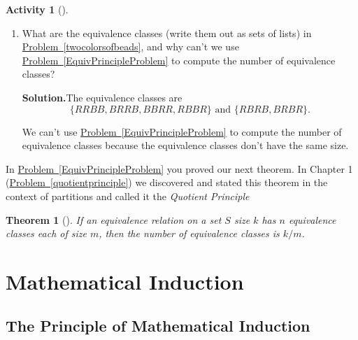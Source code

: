 \documentclass[10pt,]{book}
\theoremstyle{plain}
\newtheorem{theorem}{Theorem}[section]
\theoremstyle{definition}
\newtheorem{activity}[project]{Activity}
\numberwithin{equation}{chapter}
\begin{document}
\begin{activity}[]
\begin{enumerate}[label=(\alph*)]
~\par
\item What are the equivalence classes (write them out as sets of lists) in \hyperref[twocolorsofbeads]{Problem~\ref{twocolorsofbeads}}, and why can't we use \hyperref[EquivPrincipleProblem]{Problem~\ref{EquivPrincipleProblem}} to compute the number of equivalence classes?%
\par\medskip\noindent%
\textbf{Solution.}\quad The equivalence classes are%
\begin{equation*}
\{RRBB, BRRB, BBRR, RBBR\}
\mbox{~and~} 
\{RBRB, BRBR\}.
\end{equation*}
%
\par
We can't use \hyperref[EquivPrincipleProblem]{Problem~\ref{EquivPrincipleProblem}} to compute the number of equivalence classes because the equivalence classes don't have the same size.%

\end{enumerate}
\end{activity}
In \hyperref[EquivPrincipleProblem]{Problem~\ref{EquivPrincipleProblem}} you proved our next theorem. In Chapter 1 (\hyperref[quotientprinciple]{Problem~\ref{quotientprinciple}}) we discovered and stated this theorem in the context of partitions and called it the \emph{Quotient Principle}%
\begin{theorem}[{}]\label{theorem-11}
If an equivalence relation on a set \(S\) size \(k\) has \(n\) equivalence classes each of size \(m\), then the number of equivalence classes is \(k/m\).%
\end{theorem}
\typeout{************************************************}
\typeout{************************************************}
\chapter[{Mathematical Induction}]{Mathematical Induction}\label{Induction}
\typeout{************************************************}
\typeout{************************************************}
\section[{The Principle of Mathematical Induction}]{The Principle of Mathematical Induction}\label{section-25}
\typeout{************************************************}
\typeout{************************************************}
\end{document}
